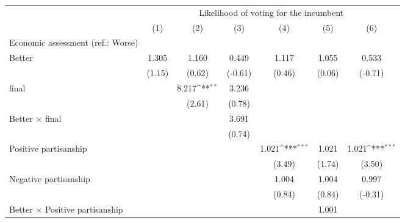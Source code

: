 {
\def\sym#1{\ifmmode^{#1}\else\(^{#1}\)\fi}
\begin{tabular}{l*{6}{c}}
\toprule
                &\multicolumn{6}{c}{Likelihood of voting for the incumbent}                                                       \\\cmidrule(lr){2-7}
                &\multicolumn{1}{c}{(1)}         &\multicolumn{1}{c}{(2)}         &\multicolumn{1}{c}{(3)}         &\multicolumn{1}{c}{(4)}         &\multicolumn{1}{c}{(5)}         &\multicolumn{1}{c}{(6)}         \\
\midrule
Economic assessment (ref.: Worse)&                  &                  &                  &                  &                  &                  \\
Better          &    1.305         &    1.160         &    0.449         &    1.117         &    1.055         &    0.533         \\
                &   (1.15)         &   (0.62)         &  (-0.61)         &   (0.46)         &   (0.06)         &  (-0.71)         \nal           &                  &    8.217\sym{**} &    3.236         &                  &                  &                  \\
                &                  &   (2.61)         &   (0.78)         &                  &                  &                  \\
Better $\times$ final&                  &                  &    3.691         &                  &                  &                  \\
                &                  &                  &   (0.74)         &                  &                  &                  \\
Positive partisanship&                  &                  &                  &    1.021\sym{***}&    1.021         &    1.021\sym{***}\\
                &                  &                  &                  &   (3.49)         &   (1.74)         &   (3.50)         \\
Negative partisanship&                  &                  &                  &    1.004         &    1.004         &    0.997         \\
                &                  &                  &                  &   (0.84)         &   (0.84)         &  (-0.31)         \\
Better $\times$ Positive partisanship&                  &                  &                  &                  &    1.001         &                  \\

\end{tabular}}
